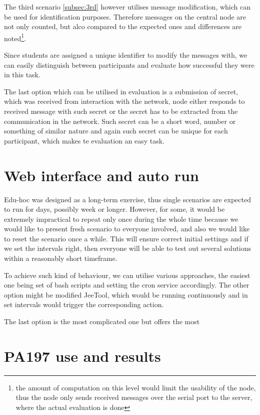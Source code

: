 \documentclass[
  print, %
  Table,   %
  nolof,     %
  nolot,     %
           oneside
]{fithesis3}
\begin{document}
  The third scenario \ref{subsec:3rd} however utilises message modification, which can be used for identification purposes. Therefore messages on the central node are not only counted, but alco compared to the expected ones and differences are noted\footnote{the amount of computation on this level would limit the usability of the node, thus the node only sends received messages over the serial port to the server, where the actual evaluation is done}.

  Since students are assigned a unique identifier to modify the messages with, we can easily distinguish between participants and evaluate how successful they were in this task.

  The last option which can be utilised in evaluation is a submission of secret, which was received from interaction with the network, node either responds to received message with such secret or the secret has to be extracted from the communication in the network. Such secret can be a short word, number or something of similar nature and again such secret can be unique for each participant, which makes te evaluation an easy task.
  \section{Web interface and auto run}
  Edu-hoc was designed as a long-term exercise, thus single scenarios are expected to run for days, possibly week or longer. However, for some, it would be extremely impractical to repeat only once during the whole time because we would like to present fresh scenario to everyone involved,  and also we would like to reset the scenario once a while. This will ensure correct initial settings and if we set the intervals right, then everyone will be able to test out several solutions within a reasonably short timeframe.

  To achieve such kind of behaviour, we can utilise various approaches, the easiest one being set of bash scripts and setting the cron service %
  accordingly. The other option might be modified JeeTool, which would be running continuously and in set intervals would trigger the corresponding action.

  The last option is the most complicated one but offers the most

  \section{PA197 use and results} \label{sec:PA197}
\end{document}
